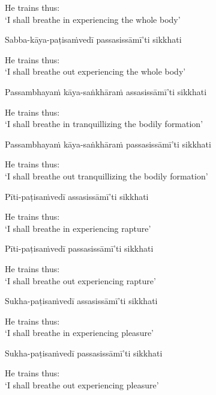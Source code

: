 \begin{english}
  He trains thus:\\
  `I shall breathe in experiencing the whole body'
\end{english}

Sabba-kāya-paṭisaṁvedī passasissāmī'ti sikkhati

\begin{english}
  He trains thus:\\
  `I shall breathe out experiencing the whole body'
\end{english}

Passambhayaṁ kāya-saṅkhāraṁ assasissāmī'ti sikkhati

\begin{english}
  He trains thus:\\
  `I shall breathe in tranquillizing the bodily formation'
\end{english}

Passambhayaṁ kāya-saṅkhāraṁ passasissāmī'ti sikkhati

\begin{english}
  He trains thus:\\
  `I shall breathe out tranquillizing the bodily formation'
\end{english}

Pīti-paṭisaṁvedī assasissāmī'ti sikkhati

\begin{english}
  He trains thus:\\
  `I shall breathe in experiencing rapture'
\end{english}

Pīti-paṭisaṁvedī passasissāmī'ti sikkhati

\begin{english}
  He trains thus:\\
  `I shall breathe out experiencing rapture'
\end{english}

Sukha-paṭisaṁvedī assasissāmī'ti sikkhati

\begin{english}
  He trains thus:\\
  `I shall breathe in experiencing pleasure'
\end{english}

Sukha-paṭisaṁvedī passasissāmī'ti sikkhati

\begin{english}
  He trains thus:\\
  `I shall breathe out experiencing pleasure’
\end{english}

